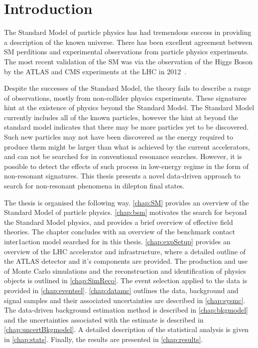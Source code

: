 \chapter{Introduction}\label{chap:intro}

The Standard Model of particle physics has had tremendous success in providing a description of the known universe. There has been excellent agreement between SM perditions and experimental observations from particle physics experiments. The most recent validation of the SM was via the observation of the Higgs Boson by the ATLAS and CMS experiments at the LHC in 2012~\cite{Chatrchyan2012,Aad_2012}.

Despite the successes of the Standard Model, the theory fails to describe a range of observations, mostly from non-collider physics experiments. These signatures hint at the existence of physics beyond the Standard Model. The Standard Model currently includes all of the known particles, however the hint at beyond the standard model indicates that there may be more particles yet to be discovered. Such new particles may not have been discovered as the energy required to produce them might be larger than what is achieved by the current accelerators, and can not be searched for in conventional resonance searches. However, it is possible to detect the effects of such process in low-energy regime in the form of non-resonant signatures. This thesis presents a novel data-driven approach to search for non-resonant phenomena in dilepton final states. 

The thesis is organised the following way. \cref{chap:SM} provides an overview of the Standard Model of particle physics. \cref{chap:bsm} motivates the search for beyond the Standard Model physics, and provides a brief overview of effective field theories. The chapter concludes with an overview of the benchmark contact inter1action model searched for in this thesis. \cref{chap:expSetup} provides an overview of the LHC accelerator and infrastructure, where a detailed outline of the ATLAS detector and it's components are provided. The production and use of Monte Carlo simulations and the reconstruction and identification of physics objects is outlined in \cref{chap:SimReco}. The event selection applied to the data is provided in \cref{chap:eventsel}. \cref{chap:datamc} outlines the data, background and signal samples and their associated uncertainties are described in \cref{chap:sysmc}. The data-driven background estimation method is described in \cref{chap:bkgmodel} and the uncertainties associated with the estimate is described in \cref{chap:uncertBkgmodel}. A detailed description of the statistical analysis is given in \cref{chap:stats}. Finally, the results are presented in \cref{chap:results}. 

